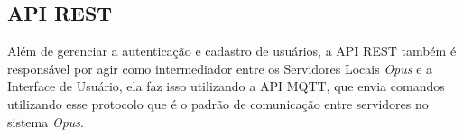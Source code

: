 \subsection{API REST}

Além de gerenciar a autenticação e cadastro de usuários, a API REST também é responsável por agir como intermediador entre os Servidores Locais \emph{Opus} e
a Interface de Usuário, ela faz isso utilizando a API MQTT, que envia comandos utilizando esse protocolo que é o padrão de comunicação entre servidores no sistema
\emph{Opus}.